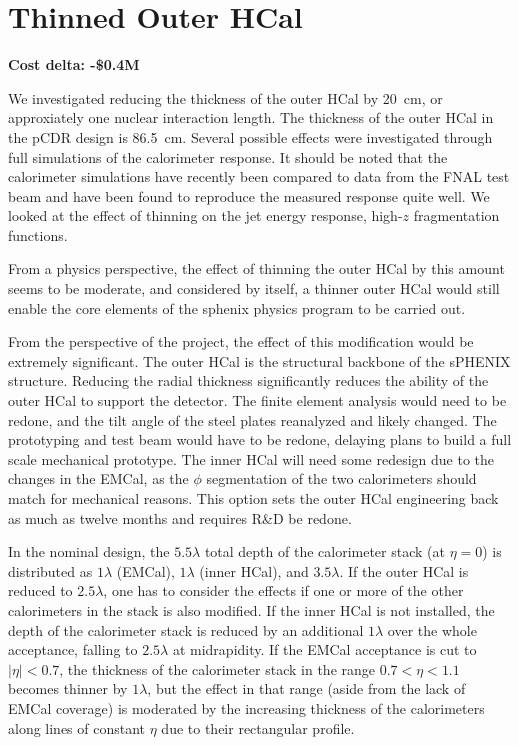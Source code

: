 \section*{Thinned Outer HCal}
\label{ohcal_thin}

\textbf{Cost delta: -\$0.4M}

We investigated reducing the thickness of the outer HCal by 20~cm, or
approxiately one nuclear interaction length.  The thickness of the
outer HCal in the pCDR design is 86.5~cm.  Several possible effects
were investigated through full \geant simulations of the calorimeter
response.  It should be noted that the calorimeter simulations have
recently been compared to data from the FNAL test beam and have been
found to reproduce the measured response quite well.  We looked at the
effect of thinning on the jet energy response, high-$z$ fragmentation
functions.

From a physics perspective, the effect of thinning the outer HCal by
this amount seems to be moderate, and considered by itself, a thinner
outer HCal would still enable the core elements of the sphenix physics
program to be carried out.

From the perspective of the project, the effect of this modification
would be extremely significant.  The outer HCal is the structural
backbone of the sPHENIX structure.  Reducing the radial thickness
significantly reduces the ability of the outer HCal to support the
detector.  The finite element analysis would need to be redone, and
the tilt angle of the steel plates reanalyzed and likely changed. The
prototyping and test beam would have to be redone, delaying plans to
build a full scale mechanical prototype.  The inner HCal will need
some redesign due to the changes in the EMCal, as the $\phi$
segmentation of the two calorimeters should match for mechanical
reasons.  This option sets the outer HCal engineering back as much as
twelve months and requires R\&D be redone.

In the nominal design, the $5.5 \lambda$ total depth of the
calorimeter stack (at $\eta = 0$) is distributed as $1 \lambda$
(EMCal), $1 \lambda$ (inner HCal), and $3.5 \lambda$.  If the outer
HCal is reduced to $2.5 \lambda$, one has to consider the effects if
one or more of the other calorimeters in the stack is also modified.
If the inner HCal is not installed, the depth of the calorimeter stack
is reduced by an additional $1 \lambda$ over the whole acceptance,
falling to $2.5 \lambda$ at midrapidity.  If the EMCal acceptance is
cut to $|\eta| < 0.7$, the thickness of the calorimeter stack in the
range $0.7 < \eta < 1.1$ becomes thinner by $1 \lambda$, but the
effect in that range (aside from the lack of EMCal coverage) is
moderated by the increasing thickness of the calorimeters along lines
of constant $\eta$ due to their rectangular profile.


